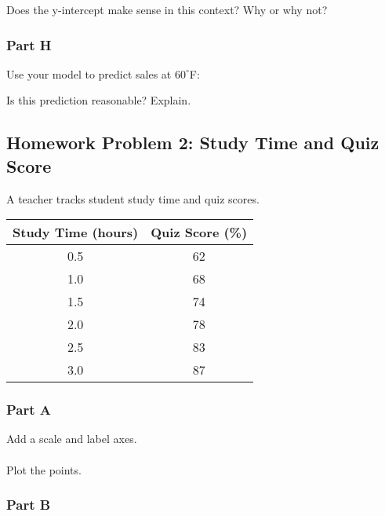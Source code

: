 \documentclass[12pt]{article}
\begin{document}
				Does the y-intercept make sense in this context? Why or why not?

				\vspace{3cm}

			\subsubsection*{Part H}
			
				Use your model to predict sales at $60^\circ$F:

				\vspace{2cm}

				Is this prediction reasonable? Explain.

				\vspace{2cm}

				\newpage

		\subsection*{Homework Problem 2: Study Time and Quiz Score}

			A teacher tracks student study time and quiz scores.

			\begin{center}
				\begin{tabular}{|c|c|}
					\hline
					Study Time (hours) & Quiz Score (\%) \\
					\hline
					0.5 & 62 \\
					1.0 & 68 \\
					1.5 & 74 \\
					2.0 & 78 \\
					2.5 & 83 \\
					3.0 & 87 \\
					\hline
				\end{tabular}
			\end{center}

			\subsubsection*{Part A}
			
				Add a scale and label axes.\\\\
				Plot the points.

				\vspace{8cm}

			\subsubsection*{Part B}
\end{document}
